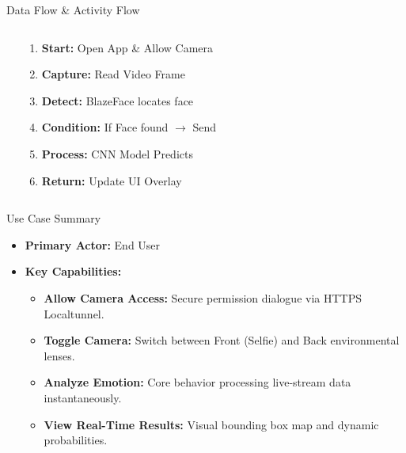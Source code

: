 \documentclass[aspectratio=169]{beamer}
\begin{document}
\begin{frame}{Data Flow \& Activity Flow}
\begin{columns}[T]
\begin{tcolorbox}[colback=white,colframe=blue!30!black,title=\textbf{Level-0 DFD}]
\centering
\vspace{0.2cm}
\vspace{0.2cm}
\end{tcolorbox}

\begin{tcolorbox}[colback=white,colframe=blue!30!black,title=\textbf{Activity Flow}]
\small
\begin{enumerate}
    \item \textbf{Start:} Open App \& Allow Camera
    \item \textbf{Capture:} Read Video Frame
    \item \textbf{Detect:} BlazeFace locates face
    \item \textbf{Condition:} If Face found $\rightarrow$ Send
    \item \textbf{Process:} CNN Model Predicts
    \item \textbf{Return:} Update UI Overlay
\end{enumerate}
\end{tcolorbox}
\end{columns}
\end{frame}

\begin{frame}{Use Case Summary}
\begin{itemize}
    \item \textbf{Primary Actor:} End User
    \item \textbf{Key Capabilities:}
    \begin{itemize}
        \item \textbf{Allow Camera Access:} Secure permission dialogue via HTTPS Localtunnel.
        \item \textbf{Toggle Camera:} Switch between Front (Selfie) and Back environmental lenses.
        \item \textbf{Analyze Emotion:} Core behavior processing live-stream data instantaneously.
        \item \textbf{View Real-Time Results:} Visual bounding box map and dynamic probabilities.
    \end{itemize}
\end{itemize}
\end{frame}
\end{document}
